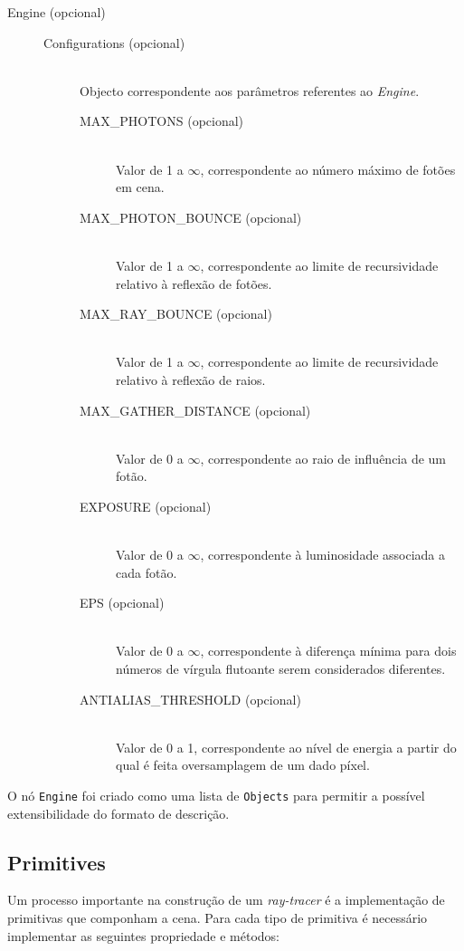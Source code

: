 \documentclass[a4paper]{article}
\begin{document}
\begin{description}
	\item[Engine (opcional)] \hfill
		\begin{description}
			\item[Configurations (opcional)] \hfill \\
				Objecto correspondente aos parâmetros referentes ao \emph{Engine}.
				\begin{description}
					\item[MAX\_PHOTONS (opcional)] \hfill \\
						Valor de 1 a $\infty$, correspondente ao número máximo de fotões em cena.
					\item[MAX\_PHOTON\_BOUNCE (opcional)] \hfill \\
						Valor de 1 a $\infty$, correspondente ao limite de recursividade relativo à reflexão de fotões.
					\item[MAX\_RAY\_BOUNCE (opcional)] \hfill \\
						Valor de 1 a $\infty$, correspondente ao limite de recursividade relativo à reflexão de raios.
					\item[MAX\_GATHER\_DISTANCE (opcional)] \hfill \\
						Valor de 0 a $\infty$, correspondente ao raio de influência de um fotão.
					\item[EXPOSURE (opcional)] \hfill \\
						Valor de 0 a $\infty$, correspondente à luminosidade associada a cada fotão.
					\item[EPS (opcional)] \hfill \\
						Valor de 0 a $\infty$, correspondente à diferença mínima para dois números de vírgula flutoante serem considerados diferentes.
					\item[ANTIALIAS\_THRESHOLD (opcional)] \hfill \\
						Valor de 0 a 1, correspondente ao nível de energia a partir do qual é feita oversamplagem de um dado píxel.
				\end{description}
		\end{description}
\end{description}

O nó \texttt{Engine} foi criado como uma lista de \texttt{Objects} para permitir a possível extensibilidade do formato de descrição.

\cleardoublepage
\subsection{Primitives}
\label{sec:primitives}
\indent \indent Um processo importante na construção de um \emph{ray-tracer} é a implementação de primitivas que componham a cena.
Para cada tipo de primitiva é necessário implementar as seguintes propriedade e métodos:
\end{document}
